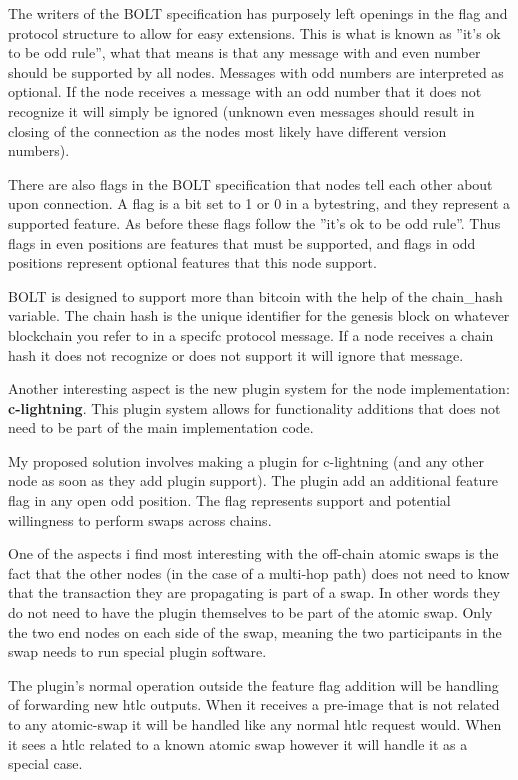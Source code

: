 The writers of the BOLT specification has purposely left openings in the
flag and protocol structure to allow for easy extensions. This is what is known
as ''it's ok to be odd rule'', what that means is that any  message with
and even number should be supported by all nodes. Messages with odd numbers 
are interpreted as optional. If the node receives a message with an odd number 
that it does not recognize it will simply be ignored (unknown even messages 
should result in closing of the connection as the nodes most likely
have different version numbers).

There are also flags in the BOLT specification that nodes tell each other about
upon connection. A flag is a bit set to 1 or 0 in a bytestring, and they 
represent a supported feature. As before these
flags follow the ''it's ok to be odd rule''. Thus flags in even positions are 
features that must be supported, and flags in odd positions represent optional
features that this node support.

BOLT is designed to support more than bitcoin with the help of the chain\_hash 
variable. The chain hash is the unique identifier for the genesis block on
whatever blockchain you refer to in a specifc protocol message. If a node
receives a chain hash it does not recognize or does not support it will ignore
that message.

Another interesting aspect is the new plugin system for the node implementation: 
\textbf{c-lightning}. This plugin system allows for functionality additions that
does not need to be part of the main implementation code. 

My proposed solution involves making a plugin for c-lightning (and any other 
node as soon as they add plugin support). The plugin add an additional 
feature flag in any open odd position. The flag represents support and potential
willingness to perform swaps across chains. 

One of the aspects i find most interesting with the off-chain atomic swaps is
the fact that the other nodes (in the case of a multi-hop path) does not need
to know that the transaction they are propagating is part of a swap. In other 
words they do not need to have the plugin themselves to be part of the atomic
swap. Only the two end nodes on each side of the swap, meaning the two 
participants in the swap needs to run special plugin software. 

The plugin's normal operation outside the feature flag addition will be handling 
of forwarding new htlc outputs. When it receives a pre-image that is not related 
to any atomic-swap it will be handled like any normal htlc request would. 
When it sees a htlc related to a known atomic swap however it will handle it as 
a special case.

